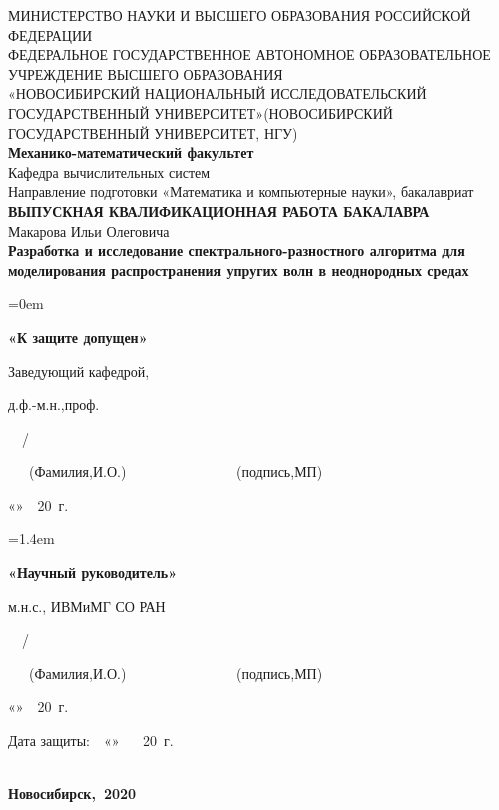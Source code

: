 \begin{singlespacing} %
\thispagestyle{empty} %
\begin{center}
\normalsize{МИНИСТЕРСТВО НАУКИ И ВЫСШЕГО ОБРАЗОВАНИЯ РОССИЙСКОЙ ФЕДЕРАЦИИ}\\
\hfill \break
\normalsize{ФЕДЕРАЛЬНОЕ ГОСУДАРСТВЕННОЕ АВТОНОМНОЕ ОБРАЗОВАТЕЛЬНОЕ УЧРЕЖДЕНИЕ ВЫСШЕГО ОБРАЗОВАНИЯ}\\
\normalsize{«НОВОСИБИРСКИЙ НАЦИОНАЛЬНЫЙ ИССЛЕДОВАТЕЛЬСКИЙ ГОСУДАРСТВЕННЫЙ УНИВЕРСИТЕТ»(НОВОСИБИРСКИЙ ГОСУДАРСТВЕННЫЙ УНИВЕРСИТЕТ, НГУ)}\\
\hfill \break
\large{\textbf{Механико-математический факультет}}\\
\large{Кафедра вычислительных систем}\\
\large{Направление подготовки «Математика и компьютерные науки», бакалавриат}\\
\hfill\break
\normalsize{\textbf{ВЫПУСКНАЯ КВАЛИФИКАЦИОННАЯ РАБОТА БАКАЛАВРА}}\\
\hfill \break
\large{Макарова Ильи Олеговича}\\
\hfill \break
\large{\textbf{Разработка и исследование спектрального-разностного алгоритма для
моделирования распространения упругих волн в неоднородных средах}}\\
\end{center}
\end{singlespacing}

\noindent
\begin{minipage}[t]{80mm}\parindent=0em
\large{\textbf{«К защите допущен»}\par
Заведующий кафедрой,\par
д.ф.-м.н.,проф.\par
{}\ \ / \ \ \makebox[3cm]{\hrulefill}\par}
\small{\ \ ~(Фамилия,И.О.)~\ \ \ \ \ \ \ \ \ \ \ \ ~ ~(подпись,МП)}\par
\large{«\makebox[1cm]{\hrulefill}»\ \makebox[3cm]{\hrulefill}\ 20\makebox[1cm]{\hrulefill}\ г.}
\end{minipage}
\hfill
\begin{minipage}[t]{80mm}\parindent=1.4em
\large{\textbf{«Научный руководитель»}\par
м.н.с., ИВМиМГ СО РАН\par
{}\ \ / \ \ \makebox[3cm]{\hrulefill}\par}
\small{\ \ ~(Фамилия,И.О.)~\ \ \ \ \ \ \ \ \ \ \ \ ~ ~(подпись,МП)}\par
\large{«\makebox[1cm]{\hrulefill}»\ \makebox[3cm]{\hrulefill}\ 20\makebox[1cm]{\hrulefill}\ г.}
\end{minipage}
\begin{flushright}
\hfill \break
\large{Дата защиты:\ \ \large{«\makebox[1cm]{\hrulefill}» \ \makebox[3cm]{\hrulefill} \ 20\makebox[1cm]{\hrulefill}\ г.}}
\end{flushright}
\begin{singlespacing}
\begin{center}
\large{\textbf{\\Новосибирск,~2020}}
\end{center} 
\end{singlespacing}
\clearpage